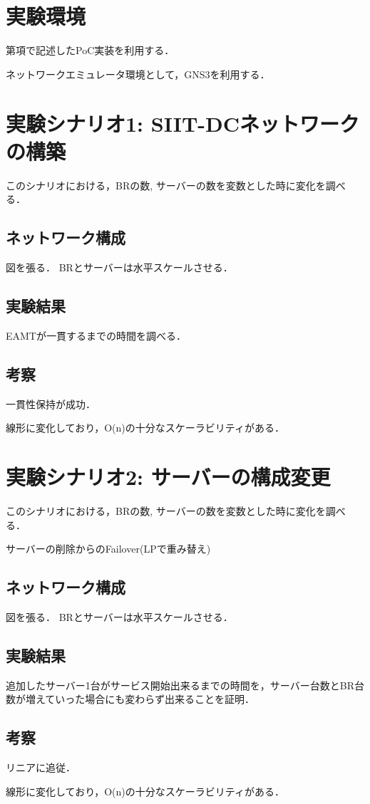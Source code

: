 \section{実験環境}
第\label{implementation:poc}項で記述したPoC実装を利用する．

ネットワークエミュレータ環境として，GNS3を利用する．



\section{実験シナリオ1: SIIT-DCネットワークの構築}
このシナリオにおける，BRの数, サーバーの数を変数とした時に変化を調べる．

\subsection{ネットワーク構成}
図を張る． BRとサーバーは水平スケールさせる．


\subsection{実験結果}
EAMTが一貫するまでの時間を調べる．

\subsection{考察}
一貫性保持が成功．

線形に変化しており，O(n)の十分なスケーラビリティがある．


\section{実験シナリオ2: サーバーの構成変更}
このシナリオにおける，BRの数, サーバーの数を変数とした時に変化を調べる．

サーバーの削除からのFailover(LPで重み替え)



\subsection{ネットワーク構成}
図を張る． BRとサーバーは水平スケールさせる．

\subsection{実験結果}
追加したサーバー1台がサービス開始出来るまでの時間を，サーバー台数とBR台数が増えていった場合にも変わらず出来ることを証明．


\subsection{考察}
リニアに追従．

線形に変化しており，O(n)の十分なスケーラビリティがある．



